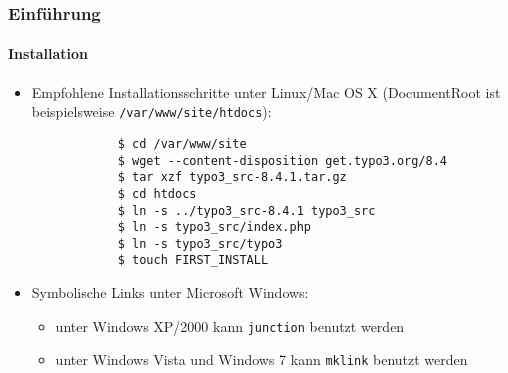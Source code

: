 \begin{frame}[fragile]
	\frametitle{Einführung}
	\framesubtitle{Installation}

	\begin{itemize}
		\item Empfohlene Installationsschritte unter Linux/Mac OS X\newline
			(DocumentRoot ist beispielsweise \texttt{/var/www/site/htdocs}):
		\begin{lstlisting}
			$ cd /var/www/site
			$ wget --content-disposition get.typo3.org/8.4
			$ tar xzf typo3_src-8.4.1.tar.gz
			$ cd htdocs
			$ ln -s ../typo3_src-8.4.1 typo3_src
			$ ln -s typo3_src/index.php
			$ ln -s typo3_src/typo3
			$ touch FIRST_INSTALL
		\end{lstlisting}

		\item Symbolische Links unter Microsoft Windows:

			\begin{itemize}
				\item unter Windows XP/2000 kann \texttt{junction} benutzt werden
				\item unter Windows Vista und Windows 7 kann \texttt{mklink} benutzt werden
			\end{itemize}

	\end{itemize}
\end{frame}

